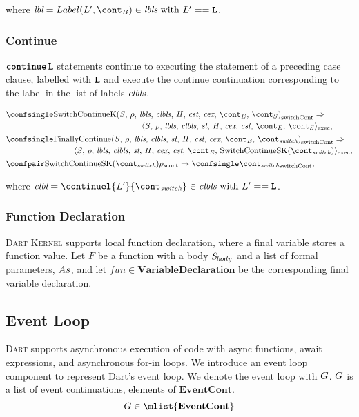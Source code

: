 \documentclass[a4paper,oneside,fleqn]{article}
\newcommand{\kernel}{\textsc{Dart Kernel}}
\newcommand{\dart}{\textsc{Dart}}
\newcommand{\synt}[1]{\ensuremath{\text{\textbf{\texttt{#1}}}}}
\DeclareMathOperator{\continue}{\synt{continue}}
\newcommand{\dncont}{\mathbf{EventCont}}
\newcommand{\dvardecl}{\mathbf{VariableDeclaration}}
\newcommand{\cesktrans}[2]{\ensuremath{{#1} \Rightarrow {#2}}}
\newcommand{\cesktranssplit}[2]{\ensuremath{{#1} \Rightarrow\\ {#2}}}
\begin{document}
\noindent where $\lbl = Label(L', \bcont) \in \lbls \text{ with } L' == \synt{L}$.


\subsubsection{Continue}

$\continue \synt{L}$ statements continue to executing the statement of a preceding case clause, labelled with $\synt{L}$ and execute the continue continuation corresponding to the label in the list of labels $\textit{clbls}$.

\begin{align*}
    &\begin{multlined}
        \cesktranssplit%
            {\switchconf{\ContinueK}}%
            {\execconf{\stmt}{\env}{\lbls}{\clbls}{\strace}{\handler}{\cex,\,\cstrace}{\econt}{\scont}},
    \end{multlined}\\
    &\begin{multlined}
        \cesktranssplit%
            {\switchconf{\FinallyContinue{\stmt}{\switchcont}}}%
            {\execconf{\stmt}{\env}{\lbls}{\clbls}{\strace}{\handler}{\cex,\,\cstrace}{\econt}{\mathrm{SwitchContinueSK}(\switchcont)}},
    \end{multlined}\\
    &\cesktrans%
        {\scontconf{\mathrm{SwitchContinueSK}(\switchcont)}{\env}}%
        {\switchconf{\switchcont}},
\end{align*}

\noindent where $\clbl = \continuel{L'}{\switchcont} \in \clbls \text{ with } L' == \synt{L}$.


\subsubsection{Function Declaration}

\kernel{} supports local function declaration, where a final variable stores a function value.
Let $F$ be a function with a body $\mathit{S}_{body}$ and a list of formal parameters, $As$, and let $fun \in \dvardecl$ be the corresponding final variable declaration.


\subsection{Event Loop}
\label{subsec:eventloop}

\dart{} supports asynchronous execution of code with async functions, await expressions, and asynchronous for-in loops.
We introduce an event loop component to represent Dart's event loop.
We denote the event loop with $G$.
$G$ is a list of event continuations, elements of $\dncont$.
\[
    \eventloop \in \mlist{\dncont}
\]
\end{document}
